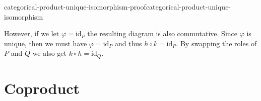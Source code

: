 \documentclass[preview]{standalone}
\begin{document}
\begin{snippetproof}{categorical-product-unique-isomorphism-proof}{categorical-product-unique-isomorphism}{}
\begin{center}
    \end{center}
    However, if we let \(\varphi=\text{id}_P\) the resulting diagram
    is also commutative.
    Since \(\varphi\) is unique, then we must have \(\varphi = \text{id}_P\)
    and thus \(h\circ k = \text{id}_P\).
    By swapping the roles of \(P\) and \(Q\) we also get
    \(k\circ h = \text{id}_Q\).
\end{snippetproof}


\section{Coproduct}
\end{document}
